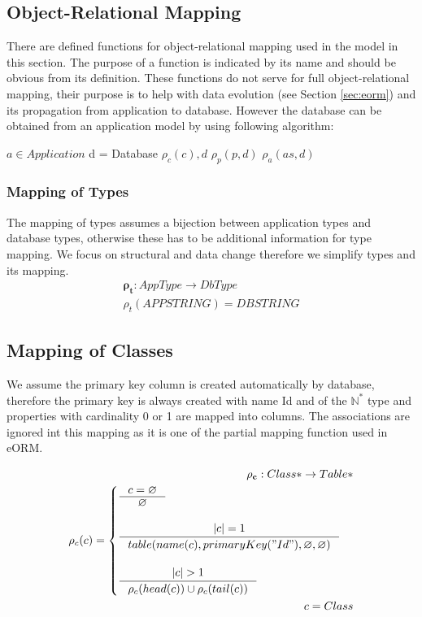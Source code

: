\documentclass[11pt]{article}
\begin{document}
\subsection{Object-Relational Mapping}
\label{sec:orm}
There are defined functions for object-relational mapping used in the model in this section. The purpose of a function is indicated by its name and should be obvious from its definition. These functions do not serve for full object-relational mapping, their purpose is to help with data evolution (see Section \ref{sec:eorm}) and its propagation from application to database. However the database can be obtained from an application model by using following algorithm:

\begin{algorithmic}[1]
	\Require $a \in Application$
	\State d = Database
		\State $\rho_c(c), d$
			\State $\rho_p(p, d)$
		\EndFor
	 \EndFor
			\State $\rho_{a}(as, d)$
		\EndFor
	\EndFor
\end{algorithmic}


\subsubsection{Mapping of Types}
The mapping of types assumes a bijection between application types and database types, otherwise these has to be additional information for type mapping. We focus on structural and data change therefore we simplify types and its mapping.
\begin{align*}
	\mathbf{\rho_{t}} : AppType \rightarrow DbType  \\
 	\rho_{t}(APPSTRING) = DBSTRING 
\end{align*}


\subsection{Mapping of Classes}
We assume the primary key column is created automatically by database, therefore the primary key is always created with name Id and of the $\mathbb{N^{*}}$ type and properties with cardinality 0 or 1 are mapped into columns. The associations are ignored int this mapping as it is one of the partial mapping function used in eORM.

\begin{align*}
	\mathbf{\rho_{c}} : Class*  \rightarrow Table* \\
	\rho_{c}(c) = \begin{cases}
		\inference{c = \varnothing}{\varnothing}\\\\
		\inference{|c| = 1}{table(name(c), primaryKey("Id"), \varnothing, \varnothing)}  \\ \\
		\inference{|c| > 1}{\rho_c(head(c)) \cup \rho_c(tail(c))}
 \end{cases}\\
 c = Class
\end{align*}
\end{document}
